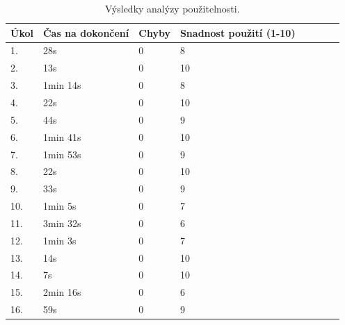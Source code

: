         \begin{table}[h]
            \centering
            \label{tab:PleskalizerTesting}
            \begin{tabular}{|p{1cm}|p{4cm}|p{1.5cm}|p{3cm}|p{2cm}|p{2.5cm}|p{2cm}|p{2cm}|}
                \hline
                Úkol & Čas na dokončení & Chyby & Snadnost použití (1-10)\\ \hline
                1. & 28s    & 0 & 8     \\ \hline
                2. & 13s    & 0 & 10    \\ \hline
                3. & 1min 14s    & 0 & 8     \\ \hline
                4. & 22s    & 0 & 10    \\ \hline
                5. & 44s    & 0 & 9     \\ \hline
                6. & 1min 41s   & 0 & 10    \\ \hline
                7. & 1min 53s   & 0 & 9     \\ \hline
                8. & 22s    & 0 & 10    \\ \hline
                9. & 33s    & 0 & 9     \\ \hline
                10. & 1min 5s   & 0 & 7     \\ \hline
                11. & 3min 32s  & 0 & 6     \\ \hline
                12. & 1min 3s   & 0 & 7     \\ \hline
                13. & 14s   & 0 & 10    \\ \hline
                14. & 7s    & 0 & 10    \\ \hline
                15. & 2min 16s  & 0 & 6     \\ \hline
                16. & 59s   & 0 & 9     \\ \hline
                
            \end{tabular}
            \caption{Výsledky analýzy použitelnosti.}
        \end{table}    

